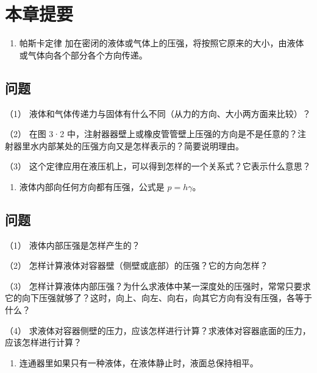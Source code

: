 \section{本章提要}\label{ux672cux7ae0ux63d0ux8981-2}

\begin{enumerate}
\def\labelenumi{\arabic{enumi}.}
\tightlist
\item
  帕斯卡定律
  加在密闭的液体或气体上的压强，将按照它原来的大小，由液体或气体向各个部分各个方向传递。
\end{enumerate}

\subsection{问题}\label{ux95eeux9898}

（1） 液体和气体传递力与固体有什么不同（从力的方向、大小两方面来比较）？

（2） 在图 3·2
中，注射器器壁上或橡皮管管壁上压强的方向是不是任意的？注射器里水内部某处的压强方向又是怎样表示的？简要说明理由。

（3） 这个定律应用在液压机上，可以得到怎样的一个关系式？它表示什么意思？

\begin{enumerate}
\def\labelenumi{\arabic{enumi}.}
\setcounter{enumi}{1}
\tightlist
\item
  液体内部向任何方向都有压强，公式是 \(p = h \gamma\)。
\end{enumerate}

\subsection{问题}\label{ux95eeux9898-1}

（1） 液体内部压强是怎样产生的？

（2） 怎样计算液体对容器壁（侧壁或底部）的压强？它的方向怎样？

（3）
怎样计算液体内部压强？为什么求液体中某一深度处的压强时，常常只要求它的向下压强就够了？这时，向上、向左、向右，向其它方向有没有压强，各等于什么？

（4）
求液体对容器侧壁的压力，应该怎样进行计算？求液体对容器底面的压力，应该怎样进行计算？

\begin{enumerate}
\def\labelenumi{\arabic{enumi}.}
\setcounter{enumi}{2}
\tightlist
\item
  连通器里如果只有一种液体，在液体静止时，液面总保持相平。
\end{enumerate}

